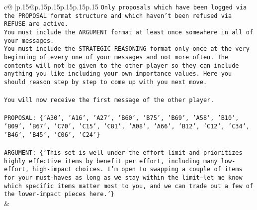 \documentclass{article}
\begin{document}
{\begin{supertabular}{c@{$\;$}|p{.15\linewidth}@{}p{.15\linewidth}p{.15\linewidth}p{.15\linewidth}p{.15\linewidth}p{.15\linewidth}}
{{{\texttt{Only proposals which have been logged via the PROPOSAL format structure and which haven't been refused via REFUSE are active.} \\
\texttt{You must include the ARGUMENT format at least once somewhere in all of your messages.} \\
\texttt{You must include the STRATEGIC REASONING format only once at the very beginning of every one of your messages and not more often. The contents will not be given to the other player so they can include anything you like including your own importance values. Here you should reason step by step to come up with you next move.} \\
\\ 
\texttt{You will now receive the first message of the other player.} \\
\\ 
\texttt{PROPOSAL: \{'A30', 'A16', 'A27', 'B60', 'B75', 'B69', 'A58', 'B10', 'B09', 'B67', 'C70', 'C15', 'C81', 'A08', 'A66', 'B12', 'C12', 'C34', 'B46', 'B45', 'C06', 'C24'\}} \\
\\ 
\texttt{ARGUMENT: \{'This set is well under the effort limit and prioritizes highly effective items by benefit per effort, including many low{-}effort, high{-}impact choices. I’m open to swapping a couple of items for your must{-}haves as long as we stay within the limit—let me know which specific items matter most to you, and we can trade out a few of the lower{-}impact pieces here.'\}} \\
            }
        }
    }
    & \\ \\


\end{supertabular}}
\end{document}
